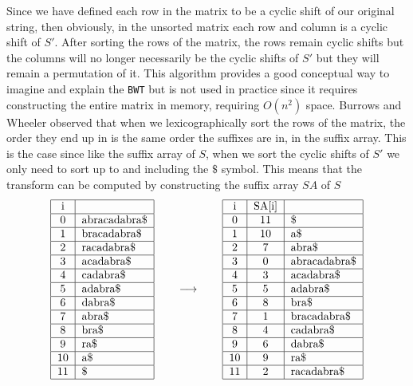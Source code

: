 \documentclass{article}
\begin{document}
Since we have defined each row in the matrix to be a cyclic shift of our original string, then obviously, in the unsorted matrix each row and column is a cyclic shift of \(S'\). After sorting the rows of the matrix, the rows remain cyclic shifts but the columns will no longer necessarily be the cyclic shifts of \(S'\) but they will remain a permutation of it. 
This algorithm provides a good conceptual way to imagine and explain the \texttt{BWT} but is not used in practice since it requires constructing the entire matrix in memory, requiring \(O(n^2)\) space.
\newline
\newline
Burrows and Wheeler observed that when we lexicographically sort the rows of the matrix, the order they end up in is the same order the suffixes are in, in the suffix array. This is the case since like the suffix array of \(S\), when we sort the cyclic shifts of \(S'\) we only need to sort up to and including the \(\$\) symbol.
This means that the transform can be computed by constructing the suffix array \(SA\) of \(S\)
\begin{equation*}
    \begin{tabular}{|c|l|}
    \hline
    i & \\ \hline
    0 & abracadabra\$ \\ \hline
    1 & bracadabra\$ \\ \hline
    2 & racadabra\$ \\ \hline
    3 & acadabra\$ \\ \hline
    4 & cadabra\$ \\ \hline
    5 & adabra\$ \\ \hline
    6 & dabra\$ \\ \hline
    7 & abra\$ \\ \hline
    8 & bra\$ \\ \hline
    9 & ra\$ \\ \hline
    10 & a\$ \\ \hline
    11 &\$ \\ \hline
    \end{tabular}
    \qquad\longrightarrow\qquad
    \begin{tabular}{|c|c|l|}
    \hline
    i & SA[i] & \\ \hline
    0 & 11 &\$ \\ \hline
    1 & 10 & a\$ \\ \hline
    2 & 7 & abra\$ \\ \hline
    3 & 0 & abracadabra\$ \\ \hline
    4 & 3 & acadabra\$ \\ \hline
    5 & 5 & adabra\$ \\ \hline
    
    6 & 8 & bra\$ \\ \hline
    7 & 1 & bracadabra\$ \\ \hline
    8 & 4 & cadabra\$ \\ \hline
    
    9 & 6 & dabra\$ \\ \hline
    10 & 9 & ra\$ \\ \hline
    11 & 2 & racadabra\$ \\ \hline
    \end{tabular}
\end{equation*}
\end{document}
